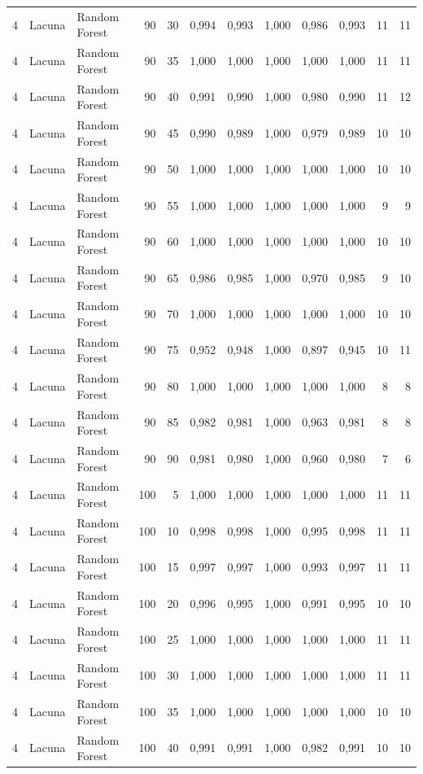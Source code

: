 \begin{longtable}{@{}rllrrrrrrrrr@{}}
4 & Lacuna & Random Forest & 90 & 30 & 0,994 & 0,993 & 1,000 & 0,986 & 0,993 & 11 & 11 \\
4 & Lacuna & Random Forest & 90 & 35 & 1,000 & 1,000 & 1,000 & 1,000 & 1,000 & 11 & 11 \\
4 & Lacuna & Random Forest & 90 & 40 & 0,991 & 0,990 & 1,000 & 0,980 & 0,990 & 11 & 12 \\
4 & Lacuna & Random Forest & 90 & 45 & 0,990 & 0,989 & 1,000 & 0,979 & 0,989 & 10 & 10 \\
4 & Lacuna & Random Forest & 90 & 50 & 1,000 & 1,000 & 1,000 & 1,000 & 1,000 & 10 & 10 \\
4 & Lacuna & Random Forest & 90 & 55 & 1,000 & 1,000 & 1,000 & 1,000 & 1,000 & 9 & 9 \\
4 & Lacuna & Random Forest & 90 & 60 & 1,000 & 1,000 & 1,000 & 1,000 & 1,000 & 10 & 10 \\
4 & Lacuna & Random Forest & 90 & 65 & 0,986 & 0,985 & 1,000 & 0,970 & 0,985 & 9 & 10 \\
4 & Lacuna & Random Forest & 90 & 70 & 1,000 & 1,000 & 1,000 & 1,000 & 1,000 & 10 & 10 \\
4 & Lacuna & Random Forest & 90 & 75 & 0,952 & 0,948 & 1,000 & 0,897 & 0,945 & 10 & 11 \\
4 & Lacuna & Random Forest & 90 & 80 & 1,000 & 1,000 & 1,000 & 1,000 & 1,000 & 8 & 8 \\
4 & Lacuna & Random Forest & 90 & 85 & 0,982 & 0,981 & 1,000 & 0,963 & 0,981 & 8 & 8 \\
4 & Lacuna & Random Forest & 90 & 90 & 0,981 & 0,980 & 1,000 & 0,960 & 0,980 & 7 & 6 \\
4 & Lacuna & Random Forest & 100 & 5 & 1,000 & 1,000 & 1,000 & 1,000 & 1,000 & 11 & 11 \\
4 & Lacuna & Random Forest & 100 & 10 & 0,998 & 0,998 & 1,000 & 0,995 & 0,998 & 11 & 11 \\
4 & Lacuna & Random Forest & 100 & 15 & 0,997 & 0,997 & 1,000 & 0,993 & 0,997 & 11 & 11 \\
4 & Lacuna & Random Forest & 100 & 20 & 0,996 & 0,995 & 1,000 & 0,991 & 0,995 & 10 & 10 \\
4 & Lacuna & Random Forest & 100 & 25 & 1,000 & 1,000 & 1,000 & 1,000 & 1,000 & 11 & 11 \\
4 & Lacuna & Random Forest & 100 & 30 & 1,000 & 1,000 & 1,000 & 1,000 & 1,000 & 11 & 11 \\
4 & Lacuna & Random Forest & 100 & 35 & 1,000 & 1,000 & 1,000 & 1,000 & 1,000 & 10 & 10 \\
4 & Lacuna & Random Forest & 100 & 40 & 0,991 & 0,991 & 1,000 & 0,982 & 0,991 & 10 & 10 \\

\end{longtable}
